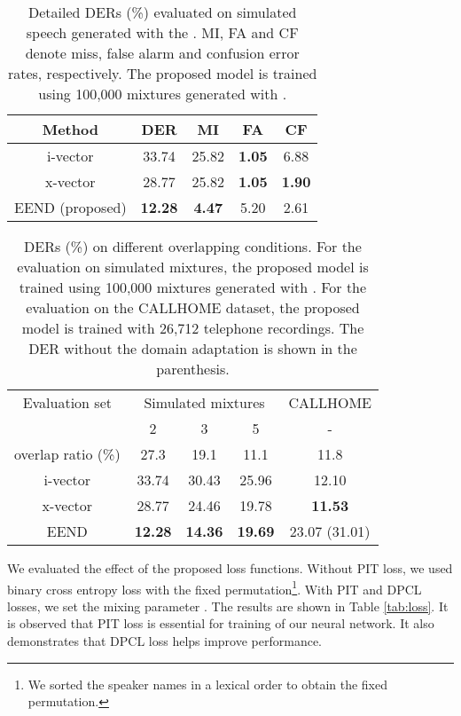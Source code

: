 \documentclass[a4paper]{article}
\begin{document}
\begin{table}[t]
\caption{Detailed DERs (\%) evaluated on simulated speech generated with the .  MI, FA and CF denote miss, false alarm and confusion error rates, respectively. The proposed model is trained using 100,000 mixtures generated with .}
\label{tab:detail}
\centering
\begin{tabular}{ccccc} \hline
Method & DER	& MI & FA & CF \\ \hline
i-vector & 33.74 & 25.82 & {\bf1.05} & 6.88 \\
x-vector &	28.77& 25.82 & {\bf1.05} &	{\bf1.90} \\
EEND (proposed) &	{\bf12.28} &	\bf{4.47}	& 5.20	&  2.61  \\ \hline
\end{tabular}
\end{table}

\begin{table}[t]
\caption{DERs (\%) on different overlapping conditions.
For the evaluation on simulated mixtures, the proposed model is trained using 100,000 mixtures generated with . For the evaluation on the CALLHOME dataset, the proposed model is trained with 26,712 telephone recordings. The DER without the domain adaptation is shown in the parenthesis.}
\label{tab:overlap}
\centering
\begin{tabular}{c|ccc|c} \hline
Evaluation set & \multicolumn{3}{c|}{Simulated mixtures} & CALLHOME \\
 & 2 & 3 & 5 & - \\
overlap ratio (\%) & 27.3 & 19.1 & 11.1 & 11.8 \\ \hline \hline
i-vector & 33.74 & 30.43 & 25.96 & 12.10\\
x-vector &	28.77& 24.46 &	19.78 & \bf{11.53} \\
EEND &	\bf{12.28} & \bf{14.36} & {\bf19.69}  &23.07 (31.01) \\ \hline
\end{tabular}
\end{table}

We evaluated the effect of the proposed loss functions.
Without PIT loss, we used binary cross entropy loss with the fixed permutation\footnote{We sorted the speaker names in a lexical order to obtain the fixed permutation.}. With PIT and DPCL losses, we set the mixing parameter .
The results are shown in Table \ref{tab:loss}.
It is observed that PIT loss is essential for training of our neural network. It also demonstrates that DPCL loss helps improve performance.
\end{document}
